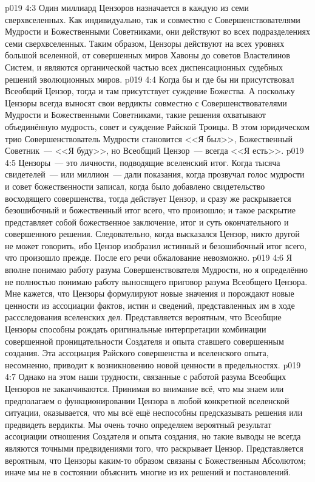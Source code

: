 \vs p019 4:3 Один миллиард Цензоров назначается в каждую из семи сверхвселенных. Как индивидуально, так и совместно с Совершенствователями Мудрости и Божественными Советниками, они действуют во всех подразделениях семи сверхвселенных. Таким образом, Цензоры действуют на всех уровнях большой вселенной, от совершенных миров Хавоны до советов Властелинов Систем, и являются органической частью всех диспенсационных судебных решений эволюционных миров.
\vs p019 4:4 \pc Когда бы и где бы ни присутствовал Всеобщий Цензор, тогда и там присутствует суждение Божества. А поскольку Цензоры всегда выносят свои вердикты совместно с Совершенствователями Мудрости и Божественными Советниками, такие решения охватывают объединённую мудрость, совет и суждение Райской Троицы. В этом юридическом трио Совершенствователь Мудрости становится <<Я был>>, Божественный Советник~--- <<Я буду>>, но Всеобщий Цензор~--- всегда <<Я есть>>.
\vs p019 4:5 \pc Цензоры~--- это личности, подводящие вселенский итог. Когда тысяча свидетелей~--- или миллион~--- дали показания, когда прозвучал голос мудрости и совет божественности записал, когда было добавлено свидетельство восходящего совершенства, тогда действует Цензор, и сразу же раскрывается безошибочный и божественный итог всего, что произошло; и такое раскрытие представляет собой божественное заключение, итог и суть окончательного и совершенного решения. Следовательно, когда высказался Цензор, никто другой не может говорить, ибо Цензор изобразил истинный и безошибочный итог всего, что произошло прежде. После его речи обжалование невозможно.
\vs p019 4:6 Я вполне понимаю работу разума Совершенствователя Мудрости, но я определённо не полностью понимаю работу выносящего приговор разума Всеобщего Цензора. Мне кажется, что Цензоры формулируют новые значения и порождают новые ценности из ассоциации фактов, истин и сведений, представленных им в ходе рассследования вселенских дел. Представляется вероятным, что Всеобщие Цензоры способны рождать оригинальные интерпретации комбинации совершенной проницательности Создателя и опыта ставшего совершенным создания. Эта ассоциация Райского совершенства и вселенского опыта, несомненно, приводит к возникновению новой ценности в предельностях.
\vs p019 4:7 Однако на этом наши трудности, связанные с работой разума Всеобщих Цензоров не заканчиваются. Принимая во внимание всё,  что мы знаем или предполагаем о функционировании Цензора в любой конкретной вселенской ситуации, оказывается, что мы всё ещё неспособны предсказывать решения или предвидеть вердикты. Мы очень точно определяем вероятный результат ассоциации отношения Создателя и опыта создания, но такие выводы не всегда являются точными предвидениями того, что раскрывает Цензор. Представляется вероятным, что Цензоры каким\hyp{}то образом связаны с Божественным Абсолютом; иначе мы не в состоянии объяснить многие из их решений и постановлений.
